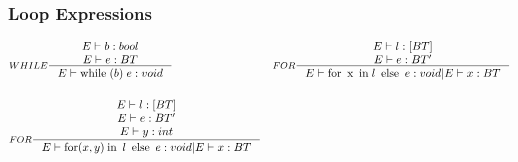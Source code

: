 \subsubsection{Loop Expressions}
\begin{align*}
&\inference[$WHILE$]{E \vdash b : bool \\
                  E \vdash e : BT}
                 {E \vdash \mathbin{\textrm{while}} \; (b) \; {e}: void}
&
&\inference[$FOR$]{E \vdash l : [BT] \\
                  E \vdash e : BT'}
                 {E \vdash \mathbin{\textrm{for}} \; \mathbin{\textrm{x}} \; \mathbin{\textrm{in}} \; {l} \; \mathbin{\textrm{else}} \; {e}: void	| E \vdash x : BT}
\\\\
&\inference[$FOR$]{E \vdash l : [BT] \\
                  E \vdash e : BT' \\
									E \vdash y : int}
                 {E \vdash \mathbin{\textrm{for}} (x,y) \mathbin{\textrm{in}} \; {l} \; \mathbin{\textrm{else}} \; {e}: void	| E \vdash x : BT}
\end{align*}